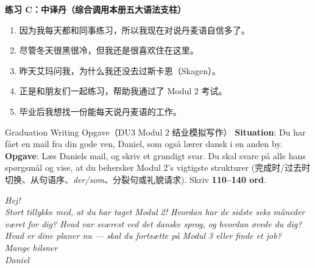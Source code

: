 \textbf{练习 C：中译丹（综合调用本册五大语法支柱）}
\begin{enumerate}
  \item 因为我每天都和同事练习，所以我现在对说丹麦语自信多了。
  \item 尽管冬天很黑很冷，但我还是很喜欢住在这里。
  \item 昨天艾玛问我，为什么我还没去过斯卡恩（Skagen）。
  \item 正是和朋友们一起练习，帮助我通过了 Modul 2 考试。
  \item 毕业后我想找一份能每天说丹麦语的工作。
\end{enumerate}


\begin{emailbox}{Graduation Writing Opgave（DU3 Modul 2 结业模拟写作）}
\textbf{Situation}: Du har fået en mail fra din gode ven, Daniel, som også lærer dansk i en anden by.\\
\textbf{Opgave}: Læs Daniels mail, og skriv et grundigt svar. Du skal svare på alle hans spørgsmål og vise, at du behersker Modul 2’s vigtigste strukturer (完成时/过去时切换、从句语序、\textit{der/som}、分裂句或礼貌请求). Skriv \textbf{110--140 ord}.

\vspace{0.3em}
\textit{Hej!\\
Stort tillykke med, at du har taget Modul 2! Hvordan har de sidste seks måneder været for dig? Hvad var sværest ved det danske sprog, og hvordan øvede du dig? Hvad er dine planer nu --- skal du fortsætte på Modul 3 eller finde et job?\\
Mange hilsner\\
Daniel}
\end{emailbox}


